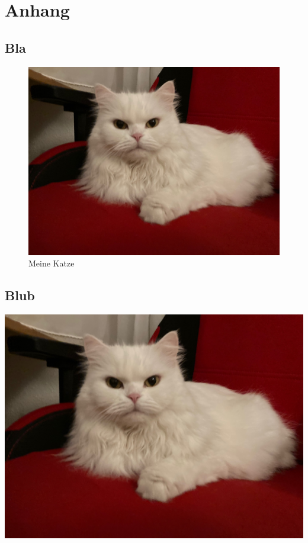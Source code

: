 \chapter{Anhang}\label{cha:Anhang}

\section{Bla}
\blindtext[5]

\begin{figure}
\includegraphics[width=\textwidth]{Bilder/Katze}
\caption{Meine Katze}\label{fig:Katze}
\end{figure}

\section{Blub}
\blindtext[5]

\includegraphics[width=\textwidth]{Bilder/Katze}
\label{fig:Katze2}

\blindtext[12]
